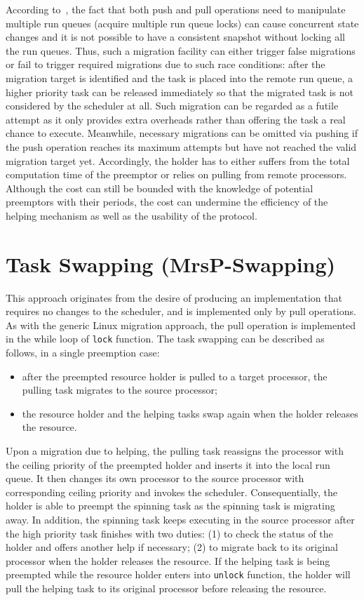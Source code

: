 \documentclass{report}
\begin{document}
According to~\cite{brandenburg2011scheduling}, the fact that both push and pull operations need to manipulate multiple run queues (acquire multiple run queue locks) can cause concurrent state changes and it is not possible to have a consistent snapshot without locking all the run queues. Thus, such a migration facility can either trigger false migrations or fail to trigger required migrations due to such race conditions: after the migration target is identified and the task is placed into the remote run queue, a higher priority task can be released immediately so that the migrated task is not considered by the scheduler at all. Such migration can be regarded as a futile attempt as it only provides extra overheads rather than offering the task a real chance to execute. Meanwhile, necessary migrations can be omitted via pushing if the push operation reaches its maximum attempts but have not reached the valid migration target yet. Accordingly, the holder has to either suffers from the total computation time of the preemptor or relies on pulling from remote processors. Although the cost can still be bounded with the knowledge of potential preemptors with their periods, the cost can undermine the efficiency of the helping mechanism as well as the usability of the protocol. 

\section{Task Swapping (MrsP-Swapping)}
This approach originates from the desire of producing an implementation that requires no changes to the scheduler, and is implemented only by pull operations. As with the generic Linux migration approach, the pull operation is implemented in the while loop of \texttt{lock} function. The task swapping can be described as follows, in a single preemption case:
\begin{itemize}
\item after  the preempted resource holder is pulled to a target processor, the pulling task migrates to the source processor;
\item the resource holder and the helping tasks swap again when the holder releases the resource. 
\end{itemize}

Upon a migration due to helping, the pulling task reassigns the processor with the ceiling priority of the preempted holder and inserts it into the local run queue. It then changes its own processor to the source processor with corresponding ceiling priority and invokes the scheduler. Consequentially, the holder is able to preempt the spinning task as the spinning task is migrating away. In addition, the spinning task keeps executing in the source processor after the high priority task finishes with two duties: (1) to check the status of the holder and offers another help if necessary; (2) to migrate back to its original processor when the holder releases the resource. If the helping task is being preempted while the resource holder enters into \texttt{unlock} function, the holder will pull the helping task to its original processor before releasing the resource.
\end{document}

